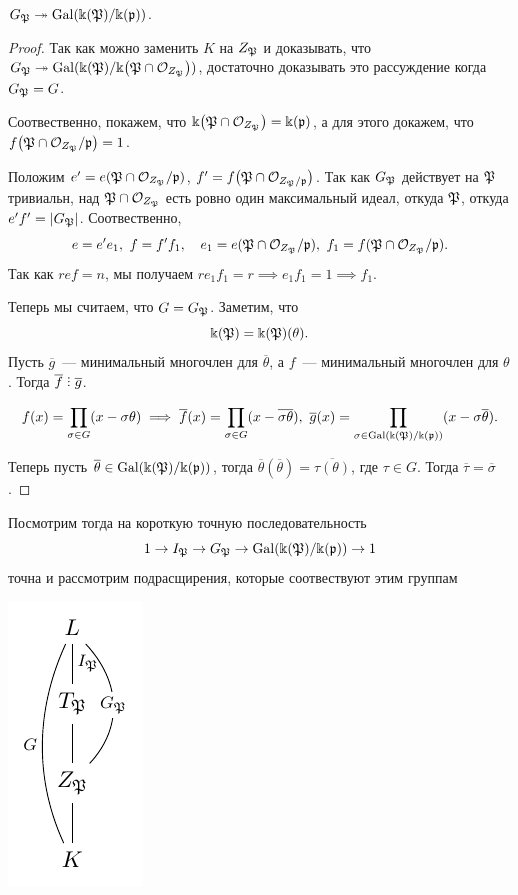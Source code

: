 	 \begin{lemma} 
	 	$G_{\fP} \twoheadrightarrow \Gal\lr*{\Bbbk\lr*{\fP}/\Bbbk\lr*{\fp}}$.
	 \end{lemma}
	 \begin{proof}
	 	Так как можно заменить $K$ на $Z_{\fP}$  и доказывать, что $G_{\fP} \twoheadrightarrow \Gal(\Bbbk\lr*{\fP}/\Bbbk\lr*{\fP \cap \cO_{Z_{\fP}}})$, достаточно доказывать это рассуждение когда $G_{\fP} = G$.

	 	Соотвественно, покажем, что $\Bbbk\lr*{ \fP \cap \cO_{Z_{\fP}} } = \Bbbk(\fp)$, а для этого докажем, что $f\lr*{\fP \cap \cO_{Z_{\fP}} /\fp } = 1$. 

	 	Положим $e' = e(\fP \cap \cO_{Z_{\fP}}/\fp)$, $f' = f\lr*{\fP \cap \cO_{Z_{\fP}/\fp}}$. Так как $G_{\fP}$ действует на $\fP$ тривиальн, над $\fP \cap \cO_{Z_{\fP}}$ есть ровно один максимальный идеал, откуда $\fP$, откуда $e' f' = |G_{\fP}|$. Соотвественно, 
	 	\[
	 		e = e' e_1, \ f = f' f_1, \quad e_1 = e(\fP \cap \cO_{Z_{\fP}}/\fp), \ f_1 = f(\fP \cap \cO_{Z_{\fP}}/\fp). 
	 	\]
	 	Так как $r e f = n$, мы получаем $r e_1 f_1 = r \implies e_1 f_1 = 1 \implies f_1$. 

	 	Теперь мы считаем, что $G = G_{\fP}$. Заметим, что 
	 	\[
	 		\Bbbk(\fP) = \Bbbk(\fP)(\theta).
	 	\]
	 	Пусть $\overline{g}$~--- минимальный многочлен для $\overline{\theta}$, а $f$~--- минимальный многочлен для $\theta$. Тогда $\overline{f} \divby \overline{g}$. 

	 	\[
	 		f(x) = \prod_{\sigma \in G}(x - \sigma \theta)  \implies \overline{f}(x) = \prod_{\sigma \in G} (x - \overline{\sigma \theta}), \ \overline{g}(x) = \prod_{\sigma \in \Gal(\Bbbk\lr*{\fP}/\Bbbk\lr*{\fp})} (x - \sigma \overline{\theta}). 
	 	\]

	 	Теперь пусть $\overline{\theta} \in \Gal(\Bbbk(\fP)/\Bbbk(\fp))$, тогда $\overline{\theta}(\overline{\theta}) = \overline{\tau(\theta)}$, где $\tau \in G$. Тогда $\overline{\tau} = \overline{\sigma}$.

	 \end{proof}

	 Посмотрим тогда на короткую точную последовательность
	 \[
	 	1 \to I_{\fP} \to G_{\fP} \to \Gal\lr*{\Bbbk\lr*{\fP}/\Bbbk\lr*{\fp}} \to 1
	 \]
	 точна и рассмотрим подрасщирения, которые соотвествуют этим группам 
	 \begin{center}
	 	\includegraphics{lectures/6/pictures/cd_44.pdf}
	 \end{center}

